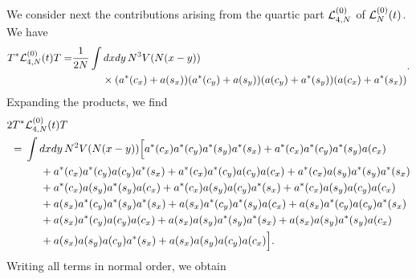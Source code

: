 \documentclass[11pt,a4paper]{article}
\newcommand{\cL}{{\cal L}}
\begin{document}
We consider next the contributions arising from the quartic part $\cL_{4,N}^{(0)}$ of $\cL_N^{(0)} (t)$. We have
\[\begin{split} T^* \cL_{4,N}^{(0)} (t) T = &\frac{1}{2N} \int dx dy \, N^3 V(N (x-y)) \\ &\hspace{1cm} \times (a^* (c_x) + a (s_x)) (a^* (c_y) + a (s_y)) (a (c_y) + a^* (s_y)) (a(c_x) + a^* (s_x)) \end{split}. \] 
Expanding the products, we find 
\[ \begin{split} 
2 T^* & \cL_{4,N}^{(0)} (t) T \\ =  \; & \int dx dy \, N^2 V (N (x-y)) \Big[ a^* (c_x) a^* (c_y) a^* (s_y) a^* (s_x) + a^* (c_x) a^* (c_y) a^* (s_y) a (c_x) \\ &\hspace{.5cm} + a^* (c_x) a^* (c_y) a(c_y) a^* (s_x) + a^* (c_x) a^* (c_y) a (c_y) a (c_x)  + a^* (c_x) a (s_y) a^* (s_y) a^* (s_x)  \\ &\hspace{.5cm}  + a^* (c_x) a (s_y) a^* (s_y) a (c_x) + a^* (c_x) a (s_y) a(c_y) a^* (s_x) + a^* (c_x) a (s_y) a (c_y) a (c_x)  \\ &\hspace{.5cm}  + a (s_x) a^* (c_y) a^* (s_y) a^* (s_x) + a (s_x) a^* (c_y) a^* (s_y) a (c_x) + a (s_x) a^* (c_y) a(c_y) a^* (s_x)  \\ &\hspace{.5cm} + a (s_x) a^* (c_y) a (c_y) a (c_x)  + a (s_x) a (s_y) a^* (s_y) a^* (s_x) + a (s_x) a (s_y) a^* (s_y) a (c_x)  \\ &\hspace{.5cm}  + a (s_x) a (s_y) a(c_y) a^* (s_x) + a (s_x) a (s_y) a (c_y) a (c_x) \Big]. 
\end{split} \]
Writing all terms in normal order, we obtain
\end{document}
